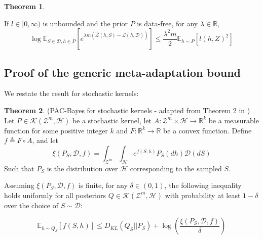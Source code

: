 \documentclass{article}
\theoremstyle{definition}
\newtheorem{theorem}{Theorem}[section]
\newcommand{\Expect}[2]{\mathbb{E}_{#1}\left [#2 \right ]}
\begin{document}
\begin{theorem} \citep{Rivasplata2020}
	
	If $l\in[0,\infty)$ is unbounded and the prior $P$ is data-free, for any $\lambda\in \mathbb{R}$,
	$$\log \Expect{S\in \mathcal{D}, h\in P}{e^{\lambda m(\hat{\mathcal{L}}(h,S)-\mathcal{L}(h,\mathcal{D}))}} \leq \frac{\lambda^2m}{2}\Expect{h\sim P}{l(h,Z)^2}$$
\end{theorem}

\subsection{Proof of the generic meta-adaptation bound} \label{append:proof-main-result}

We restate the result for stochastic kernels:

\begin{theorem} (PAC-Bayes for stochastic kernels - adapted from Theorem 2 in \citet{Rivasplata2020}) \label{thm:rivasplata-pb-appendix}
	Let $P\in \mathcal{K}(\mathcal{Z}^m, \mathcal{H})$ be a stochastic kernel, let $A: \mathcal{Z}^m\times \mathcal{H}\rightarrow \mathbb{R}^k$ be a measurable function for some positive integer $k$ and $F:\mathbb{R}^k\rightarrow \mathbb{R}$ be a convex function.
	Define $f\triangleq F\circ A$, and let 
	$$\xi(P_S, \mathcal{D}, f)=\int_{\mathcal{Z}^m}\int_{\mathcal{H}}e^{f(S, h)}P_S(dh)\mathcal{D}(dS)$$
	Such that $P_S$ is the distribution over $\mathcal{H}$ corresponding to the sampled $S$.
	
	Assuming $\xi(P_S, \mathcal{D}, f)$ is finite, for any $\delta \in (0,1)$, the following inequality holds uniformly for all posteriors $Q\in \mathcal{K}(\mathcal{Z}^m, \mathcal{H})$ with probability at least $1-\delta$ over the choice of $S\sim \mathcal{D}$:
	
	\begin{equation} \label{eq:ribasplata-pb-appendix}
	\Expect{h\sim Q_S}{f(S, h)} \leq D_{KL}(Q_S||P_S)+\log\left (\frac{\xi(P_S, \mathcal{D}, f)}{\delta}\right )
	\end{equation}
\end{theorem}
\end{document}
